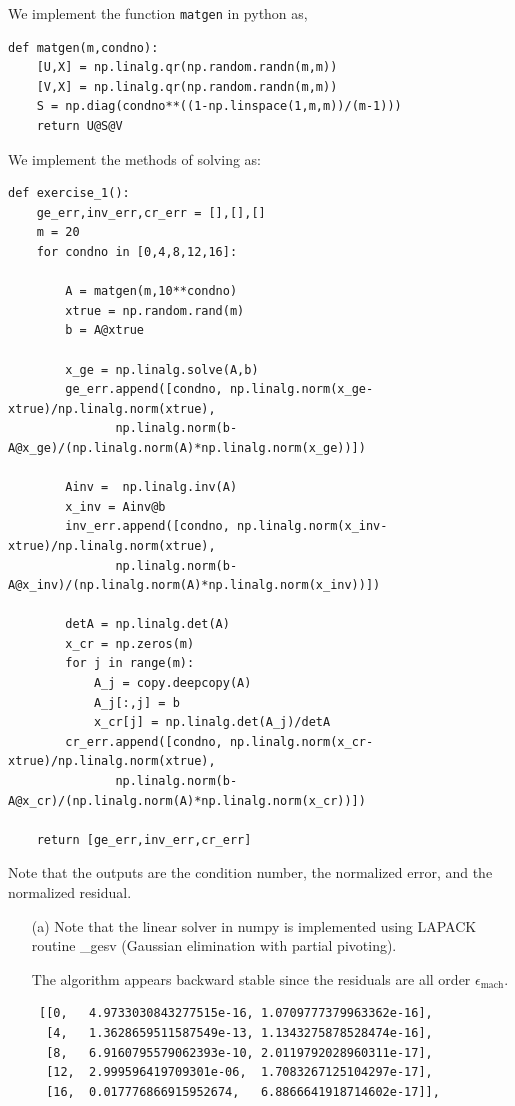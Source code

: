 \documentclass[10pt]{article}
\begin{document}
\begin{solution}[Solution]
We implement the function \verb|matgen| in python as,
\begin{lstlisting}
def matgen(m,condno):
    [U,X] = np.linalg.qr(np.random.randn(m,m))
    [V,X] = np.linalg.qr(np.random.randn(m,m))
    S = np.diag(condno**((1-np.linspace(1,m,m))/(m-1)))
    return U@S@V
\end{lstlisting}

We implement the methods of solving as:
\begin{lstlisting}
def exercise_1():
    ge_err,inv_err,cr_err = [],[],[]
    m = 20
    for condno in [0,4,8,12,16]:
        
        A = matgen(m,10**condno)
        xtrue = np.random.rand(m)
        b = A@xtrue

        x_ge = np.linalg.solve(A,b)
        ge_err.append([condno, np.linalg.norm(x_ge-xtrue)/np.linalg.norm(xtrue),
               np.linalg.norm(b-A@x_ge)/(np.linalg.norm(A)*np.linalg.norm(x_ge))])
        
        Ainv =  np.linalg.inv(A)
        x_inv = Ainv@b
        inv_err.append([condno, np.linalg.norm(x_inv-xtrue)/np.linalg.norm(xtrue),
               np.linalg.norm(b-A@x_inv)/(np.linalg.norm(A)*np.linalg.norm(x_inv))])
    
        detA = np.linalg.det(A)
        x_cr = np.zeros(m)
        for j in range(m):
            A_j = copy.deepcopy(A)
            A_j[:,j] = b
            x_cr[j] = np.linalg.det(A_j)/detA
        cr_err.append([condno, np.linalg.norm(x_cr-xtrue)/np.linalg.norm(xtrue),
               np.linalg.norm(b-A@x_cr)/(np.linalg.norm(A)*np.linalg.norm(x_cr))])

    return [ge_err,inv_err,cr_err]
\end{lstlisting}

Note that the outputs are the condition number, the normalized error, and the normalized residual.

\begin{enumerate}
    \item[(a)] Note that the linear solver in numpy is implemented using LAPACK routine \_gesv (Gaussian elimination with partial pivoting).

        The algorithm appears backward stable since the residuals are all order \( \epsilon_{\text{mach}} \).
        \begin{lstlisting}
 [[0,   4.9733030843277515e-16, 1.0709777379963362e-16],
  [4,   1.3628659511587549e-13, 1.1343275878528474e-16],
  [8,   6.9160795579062393e-10, 2.0119792028960311e-17],
  [12,  2.999596419709301e-06,  1.7083267125104297e-17],
  [16,  0.017776866915952674,   6.8866641918714602e-17]],
        \end{lstlisting}


\end{enumerate}
\end{solution}
\end{document}
